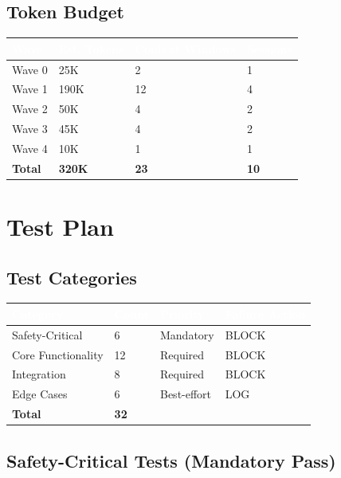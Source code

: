\documentclass[11pt,letterpaper]{article}
\newcommand{\tableheader}[1]{\textbf{\sffamily\textcolor{white}{#1}}}
\begin{document}
\subsection{Token Budget}

\begin{center}
\begin{tabularx}{\textwidth}{L{3cm}C{2cm}C{2.5cm}C{2cm}}
\toprule
{}
\tableheader{Wave} & \tableheader{Est. Tokens} & \tableheader{Context Windows} & \tableheader{Sessions} \\
\midrule
Wave 0 & 25K & 2 & 1 \\
Wave 1 & 190K & 12 & 4 \\
Wave 2 & 50K & 4 & 2 \\
Wave 3 & 45K & 4 & 2 \\
Wave 4 & 10K & 1 & 1 \\
\midrule
\textbf{Total} & \textbf{320K} & \textbf{23} & \textbf{10} \\
\bottomrule
\end{tabularx}
\end{center}

\section{Test Plan}

\subsection{Test Categories}

\begin{center}
\begin{tabularx}{\textwidth}{L{3.5cm}C{1.5cm}C{2cm}C{2cm}}
\toprule
{}
\tableheader{Category} & \tableheader{Count} & \tableheader{Priority} & \tableheader{Failure Action} \\
\midrule
Safety-Critical & 6 & Mandatory & BLOCK \\
Core Functionality & 12 & Required & BLOCK \\
Integration & 8 & Required & BLOCK \\
Edge Cases & 6 & Best-effort & LOG \\
\midrule
\textbf{Total} & \textbf{32} & & \\
\bottomrule
\end{tabularx}
\end{center}

\subsection{Safety-Critical Tests (Mandatory Pass)}
\end{document}
